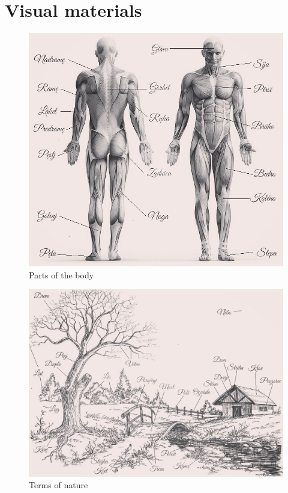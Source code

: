 \section{Visual materials}

\begin{figure}
	\includegraphics[width=\linewidth]{./sources/body.jpeg}
	\caption{Parts of the body}
	\label{fig:body}
\end{figure}

\begin{figure}
	\includegraphics[width=\linewidth]{./sources/nature.jpeg}
	\caption{Terms of nature}
	\label{fig:nature}
\end{figure}

